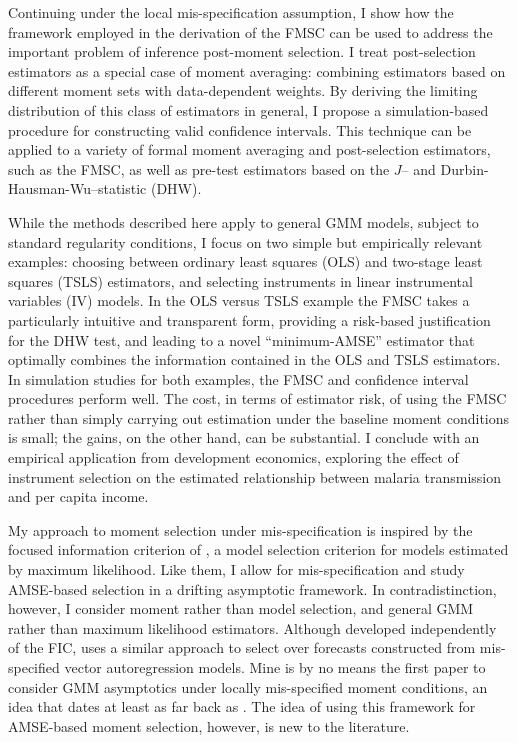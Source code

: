 Continuing under the local mis-specification assumption, I show how the framework employed in the derivation of the FMSC can be used to address the important problem of inference post-moment selection.
I treat post-selection estimators as a special case of moment averaging: combining estimators based on different moment sets with data-dependent weights.
By deriving the limiting distribution of this class of estimators in general, I propose a simulation-based procedure for constructing valid confidence intervals. 
This technique can be applied to a variety of formal moment averaging and post-selection estimators, such as the FMSC, as well as pre-test estimators based on the $J$-- and Durbin-Hausman-Wu--statistic (DHW).

While the methods described here apply to general GMM models, subject to standard regularity conditions, I focus on two simple but empirically relevant examples: choosing between ordinary least squares (OLS) and two-stage least squares (TSLS) estimators, and selecting instruments in linear instrumental variables (IV) models. 
In the OLS versus TSLS example the FMSC takes a particularly intuitive and transparent form, providing a risk-based justification for the DHW test, and leading to a novel ``minimum-AMSE'' estimator that optimally combines the information contained in the OLS and TSLS estimators.
In simulation studies for both examples, the FMSC and confidence interval procedures perform well.
The cost, in terms of estimator risk, of using the FMSC rather than simply carrying out estimation under the baseline moment conditions is small; the gains, on the other hand, can be substantial.
I conclude with an empirical application from development economics, exploring the effect of instrument selection on the estimated relationship between malaria transmission and per capita income.

My approach to moment selection under mis-specification is inspired by the focused information criterion of \citet{ClaeskensHjort2003}, a model selection criterion for models estimated by maximum likelihood. 
Like them, I allow for mis-specification and study AMSE-based selection in a drifting asymptotic framework. 
In contradistinction, however, I consider moment rather than model selection, and general GMM rather than maximum likelihood estimators.
Although developed independently of the FIC, \cite{Schorfheide2005} uses a similar approach to select over forecasts constructed from mis-specified vector autoregression models.
Mine is by no means the first paper to consider GMM asymptotics under locally mis-specified moment conditions, an idea that dates at least as far back as \cite{Newey1985}.
The idea of using this framework for AMSE-based moment selection, however, is new to the literature. 

